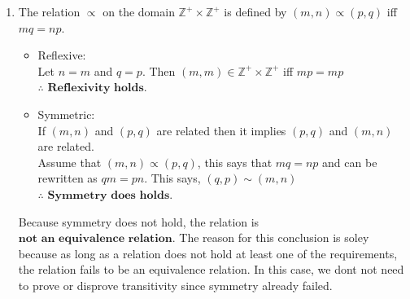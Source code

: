 \documentclass{article}
\newcommand{\Z}{\mathbb{Z}}
\begin{document}
\begin{enumerate}
\begin{enumerate}
    \item The relation $\varpropto$ on the domain $\Z^+\times\Z^+$ is defined by $(m,n) \varpropto (p,q)$ iff $mq = np$.
    \begin{itemize}
        \item Reflexive:\\Let $n = m$ and $q = p$. Then $(m,m) \in \Z^+\times\Z^+$ iff $mp = mp$\\$\therefore$ $\textbf{Reflexivity holds.}$\\
        \item Symmetric:\\If $(m,n)$ and $(p,q)$ are related then it implies $(p,q)$ and $(m,n)$ are related.\\Assume that $(m,n) \varpropto (p,q)$,
        this says that $mq = np$ and can be rewritten as $qm = pn$. This says, $(q,p) \sim (m,n)$\\$\therefore$ $\textbf{Symmetry does holds.}$
    \end{itemize}

    Because symmetry does not hold, the relation is $\textbf{not an equivalence relation.}$ The reason for this conclusion is soley
    because as long as a relation does not hold at least one of the requirements, the relation fails to be an equivalence relation. In this case,
    we dont not need to prove or disprove transitivity since symmetry already failed.
\end{enumerate}

\end{enumerate}
\end{document}

